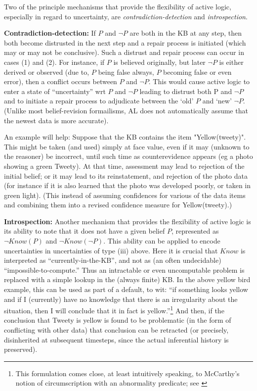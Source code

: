 Two of the principle mechanisms that provide the flexibility of
active logic, especially in regard to uncertainty, are {\em
contradiction-detection}  and {\em introspection}.

{\bf Contradiction-detection:} If $P$ and $\neg P$ are both
in the KB at any step, then both 
become distrusted in the next step and a repair process is initiated
(which may or may not be conclusive). Such a distrust and repair
process can occur in cases (1) and (2). For instance, if $P$ is believed
originally, but later $\neg P$ is either derived or observed (due to, $P$
being false always, $P$ becoming false or even error), then a conflict
occurs between $P$ and $\neg P$. This would cause active logic to enter a
state of ``uncertainty'' wrt $P$ and $\neg P$ leading to distrust both P and
$\neg P$ and to initiate a repair process to
adjudicate between the `old' $P$ and `new' $\neg P$. (Unlike most
belief-revision formailisms, AL does not automatically assume that the
newest data is more accurate). 


An example will help:  Suppose that the KB contains the item
"Yellow(tweety)".  This might be taken (and used) simply at face value,
even if it may (unknown to the reasoner) be incorrect, until such time
as counterevidence appears (eg a photo showing a green Tweety). At
that time, assessment may lead to rejection of the initial belief; or it
may lead to its reinstatement, and rejection of the photo data (for
instance if it is also learned that the photo was developed poorly, or
taken in green light).  (This instead of assuming confidences for various
of the data items and combining them into a revised confidence measure
for Yellow(tweety).)

{\bf Introspection:} Another mechanism that provides the flexibility
of active logic is its ability to note that it does not have a given
belief $P$, represented as $\neg Know(P)$ and $\neg Know (\neg P)
$. This ability can be applied to encode uncertainties in
uncertainties of type (iii) above.  Here it is crucial that $Know$ is
interpreted as ``currently-in-the-KB'', and not as (an often undecidable)
``impossible-to-compute.''  Thus an intractable or even uncomputable
problem is replaced with a simple lookup in the (always finite) KB. In
the above yellow bird example, this can be used as part of a default,
to wit: ``if something looks yellow and if I (currently) have no
knowledge that there is an irregularity about the situation, then I
will conclude that it in fact is yellow.''\footnote
{
This formulation comes close, at least intuitively speaking, to
McCarthy's notion of circumscription with an abnormality predicate;
see \cite{mccarthy...}
}
And then, if the conclusion that Tweety is yellow is found to be
problematic (in the form of conflicting with other data) that
conclusion can be retracted (or precisely, disinherited at
subsequent timesteps, since the actual inferential history is
preserved).


